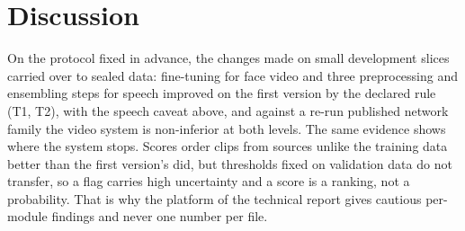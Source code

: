 \documentclass[conference,a4paper]{IEEEtran_nodash}
\begin{document}
\section{Discussion}\label{sec:disc}
On the protocol fixed in advance, the changes made on small development slices
carried over to sealed data: fine-tuning for face video and three preprocessing
and ensembling steps for speech improved on the first version by the declared rule
(T1, T2), with the speech caveat above, and against a re-run published network
family the video system is non-inferior at both levels. The same evidence shows
where the system stops. Scores order clips from sources unlike the training data
better than the first version's did, but thresholds fixed on validation data do
not transfer, so a flag carries high uncertainty and a score is a ranking, not a
probability. That is why the platform of the technical report gives cautious
per-module findings and never one number per file.

\end{document}
